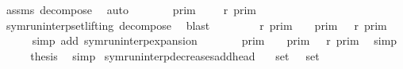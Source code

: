 \begin{isabellebody}
\ assms\ decompose\ \isamarkupfalse%
\ auto\isanewline
\ \ \isamarkupfalse%
\ \isamarkupfalse%
\ {\isacartoucheopen}{\isasymlbrakk}{\isasymlbrakk}\ {\isasymGamma}{\isacharprime}\ {\isasymrbrakk}{\isasymrbrakk}\isactrlsub p\isactrlsub r\isactrlsub i\isactrlsub m\ {\isacharequal}\ {\isasymlbrakk}{\isasymlbrakk}\ {\isasymGamma}\ {\isacharat}\ {\isasymGamma}\isactrlsub r\ {\isasymrbrakk}{\isasymrbrakk}\isactrlsub p\isactrlsub r\isactrlsub i\isactrlsub m{\isacartoucheclose}\isanewline
\ \ \ \ \isamarkupfalse%
\ symrun{\isacharunderscore}interp{\isacharunderscore}set{\isacharunderscore}lifting\ decompose\ \isamarkupfalse%
\ blast\isanewline
\ \ \isamarkupfalse%
\ \isamarkupfalse%
\ {\isacartoucheopen}{\isasymlbrakk}{\isasymlbrakk}\ {\isasymGamma}\ {\isacharat}\ {\isasymGamma}\isactrlsub r\ {\isasymrbrakk}{\isasymrbrakk}\isactrlsub p\isactrlsub r\isactrlsub i\isactrlsub m\ {\isacharequal}\ {\isasymlbrakk}{\isasymlbrakk}\ {\isasymGamma}\ {\isasymrbrakk}{\isasymrbrakk}\isactrlsub p\isactrlsub r\isactrlsub i\isactrlsub m\ {\isasyminter}\ {\isasymlbrakk}{\isasymlbrakk}\ {\isasymGamma}\isactrlsub r\ {\isasymrbrakk}{\isasymrbrakk}\isactrlsub p\isactrlsub r\isactrlsub i\isactrlsub m{\isacartoucheclose}\isanewline
\ \ \ \ \isamarkupfalse%
\ {\isacharparenleft}simp\ add{\isacharcolon}\ symrun{\isacharunderscore}interp{\isacharunderscore}expansion{\isacharparenright}\isanewline
\ \ \isamarkupfalse%
\ \isamarkupfalse%
\ {\isacartoucheopen}{\isasymlbrakk}{\isasymlbrakk}\ {\isasymGamma}\ {\isasymrbrakk}{\isasymrbrakk}\isactrlsub p\isactrlsub r\isactrlsub i\isactrlsub m\ {\isasymsupseteq}\ {\isasymlbrakk}{\isasymlbrakk}\ {\isasymGamma}\ {\isasymrbrakk}{\isasymrbrakk}\isactrlsub p\isactrlsub r\isactrlsub i\isactrlsub m\ {\isasyminter}\ {\isasymlbrakk}{\isasymlbrakk}\ {\isasymGamma}\isactrlsub r\ {\isasymrbrakk}{\isasymrbrakk}\isactrlsub p\isactrlsub r\isactrlsub i\isactrlsub m{\isacartoucheclose}\ \isamarkupfalse%
\ simp\isanewline
\ \ \isamarkupfalse%
\ \isamarkupfalse%
\ {\isacharquery}thesis\ \isamarkupfalse%
\ simp\isanewline
{}\isamarkupfalse%
%
\endisatagproof
{\isafoldproof}%
%
\isadelimproof
\isanewline
%
\endisadelimproof
\isanewline
{}\isamarkupfalse%
\ symrun{\isacharunderscore}interp{\isacharunderscore}decreases{\isacharunderscore}add{\isacharunderscore}head{\isacharcolon}\isanewline
\ \ \ {\isacartoucheopen}set\ {\isasymGamma}\ {\isasymsubseteq}\ set\ {\isasymGamma}{\isacharprime}{\isacartoucheclose}\isanewline

\end{isabellebody}
